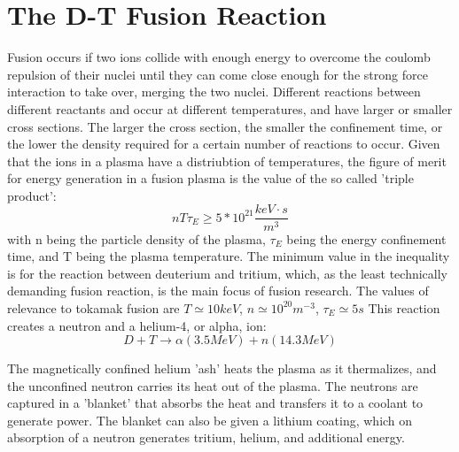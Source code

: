 \section{The D-T Fusion Reaction}
Fusion occurs if two ions collide with enough energy to overcome the coulomb repulsion of their nuclei until they can come close enough for the strong force interaction to take over, merging the two nuclei.  Different reactions between different reactants and occur at different temperatures, and have larger or smaller cross sections.  The larger the cross section, the smaller the confinement time, or the lower the density required for a certain number of reactions to occur.  Given that the ions in a plasma have a distriubtion of temperatures, the figure of merit for energy generation in a fusion plasma is the value of the so called 'triple product':\begin{equation}
nT\tau_E \geq 5*10^{21} \frac{keV\cdot s}{m^3}
\end{equation} with n being the particle density of the plasma, $\tau_E$ being the energy confinement time, and T being the plasma temperature.  The minimum value in the inequality is for the reaction between deuterium and tritium, which, as the least technically demanding fusion reaction, is the main focus of fusion research.  The values of relevance to tokamak fusion are $T \simeq 10keV$, $n \simeq 10^{20}m^{-3}$, $\tau_E \simeq  5s$ This reaction creates a neutron and a helium-4, or alpha, ion:\begin{equation}
D+T \rightarrow \alpha(3.5MeV) + n(14.3 MeV)
\end{equation}

The magnetically confined helium 'ash' heats the plasma as it thermalizes, and the unconfined neutron carries its heat out of the plasma.  The neutrons are captured in a 'blanket' that absorbs the heat and transfers it to a coolant to generate power.  The blanket can also be given a lithium coating, which on absorption of a neutron generates tritium, helium, and additional energy.\par
